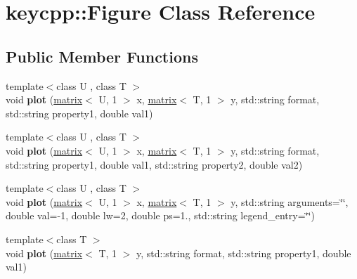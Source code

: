 \hypertarget{classkeycpp_1_1_figure}{\section{keycpp\-:\-:Figure Class Reference}
\label{classkeycpp_1_1_figure}
}
\subsection*{Public Member Functions}
\begin{DoxyCompactItemize}
\item 
\hypertarget{classkeycpp_1_1_figure_a5a062460f59124050db83df4e4a40113}{{\footnotesize template$<$class U , class T $>$ }\\void {\bfseries plot} (\hyperlink{classkeycpp_1_1matrix}{matrix}$<$ U, 1 $>$ x, \hyperlink{classkeycpp_1_1matrix}{matrix}$<$ T, 1 $>$ y, std\-::string format, std\-::string property1, double val1)}\label{classkeycpp_1_1_figure_a5a062460f59124050db83df4e4a40113}

\item 
\hypertarget{classkeycpp_1_1_figure_ae408abfc6e8afe57f03a4a27f85f8aa4}{{\footnotesize template$<$class U , class T $>$ }\\void {\bfseries plot} (\hyperlink{classkeycpp_1_1matrix}{matrix}$<$ U, 1 $>$ x, \hyperlink{classkeycpp_1_1matrix}{matrix}$<$ T, 1 $>$ y, std\-::string format, std\-::string property1, double val1, std\-::string property2, double val2)}\label{classkeycpp_1_1_figure_ae408abfc6e8afe57f03a4a27f85f8aa4}

\item 
\hypertarget{classkeycpp_1_1_figure_a0a4b5dccade75ce6ccf12f44d2fb5073}{{\footnotesize template$<$class U , class T $>$ }\\void {\bfseries plot} (\hyperlink{classkeycpp_1_1matrix}{matrix}$<$ U, 1 $>$ x, \hyperlink{classkeycpp_1_1matrix}{matrix}$<$ T, 1 $>$ y, std\-::string arguments=\char`\"{}\char`\"{}, double val=-\/1, double lw=2, double ps=1., std\-::string legend\-\_\-entry=\char`\"{}\char`\"{})}\label{classkeycpp_1_1_figure_a0a4b5dccade75ce6ccf12f44d2fb5073}

\item 
\hypertarget{classkeycpp_1_1_figure_a926ff8dedfb7f0a55b764758d7282d4a}{{\footnotesize template$<$class T $>$ }\\void {\bfseries plot} (\hyperlink{classkeycpp_1_1matrix}{matrix}$<$ T, 1 $>$ y, std\-::string format, std\-::string property1, double val1)}\label{classkeycpp_1_1_figure_a926ff8dedfb7f0a55b764758d7282d4a}


\end{DoxyCompactItemize}
